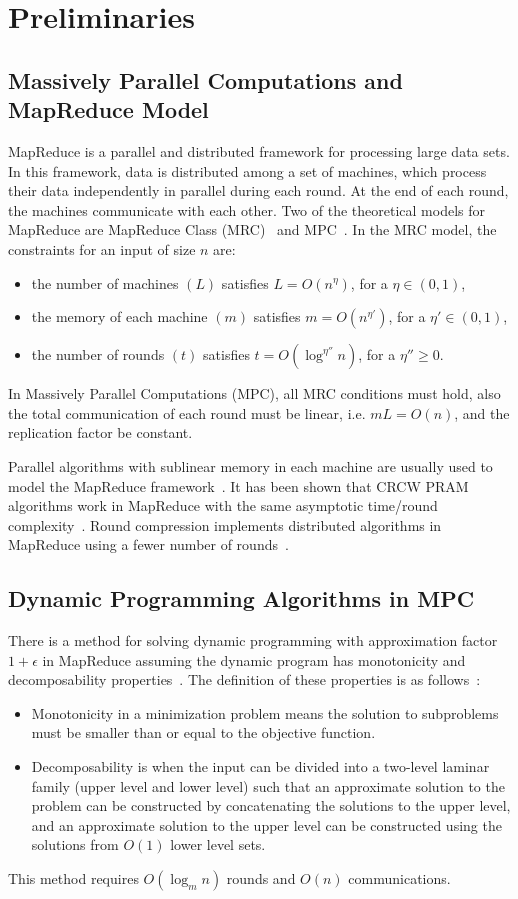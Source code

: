\documentclass[preprint,12pt]{elsarticle}
\begin{document}
\section{Preliminaries}

\subsection{Massively Parallel Computations and MapReduce Model}\label{lit:mpc}
MapReduce is a parallel and distributed framework for processing large data sets. In this framework, data is distributed among a set of machines, which process their data independently in parallel during each round. At the end of each round, the machines communicate with each other.
Two of the theoretical models for MapReduce are MapReduce Class (MRC)~\cite{mrc} and MPC~\cite{mpc}. In the MRC model, the constraints for an input of size $n$ are:
\begin{itemize}
\item the number of machines $(L)$ satisfies $L=O(n^{\eta})$, for a $\eta\in(0,1)$,
\item the memory of each machine $(m)$ satisfies $m=O(n^{\eta'})$, for a $\eta'\in(0,1)$,
\item the number of rounds $(t)$ satisfies $t=O(\log^{\eta''} n)$, for a $\eta''\geq 0$.
\end{itemize}
In Massively Parallel Computations (MPC), all MRC conditions must hold, also the total communication of each round must be linear, i.e. $mL=O(n)$, and the replication factor be constant.

Parallel algorithms with sublinear memory in each machine are usually used to model the MapReduce framework~\cite{mrc,mpc}. It has been shown that CRCW PRAM algorithms work in MapReduce with the same asymptotic time/round complexity~\cite{goodrich2011sortingI}.
Round compression implements distributed algorithms in MapReduce using a fewer number of rounds~\cite{czumaj2019round}.

\subsection{Dynamic Programming Algorithms in MPC}\label{lit:dpmpc}
There is a method for solving dynamic programming with approximation factor $1+\epsilon$ in MapReduce assuming the dynamic program has monotonicity and decomposability properties~\cite{im2017efficient}.
The definition of these properties is as follows~\cite{im2017efficient}:
\begin{itemize}
\item Monotonicity in a minimization problem means the solution to subproblems must be smaller than or equal to the objective function.
\item Decomposability is when the input can be divided into a two-level laminar family (upper level and lower level) such that an approximate solution to the problem can be constructed by concatenating the solutions to the upper level, and an approximate solution to the upper level can be constructed using the solutions from $O(1)$ lower level sets.
\end{itemize}
This method requires $O(\log_m n)$ rounds and $O(n)$ communications.
\end{document}
